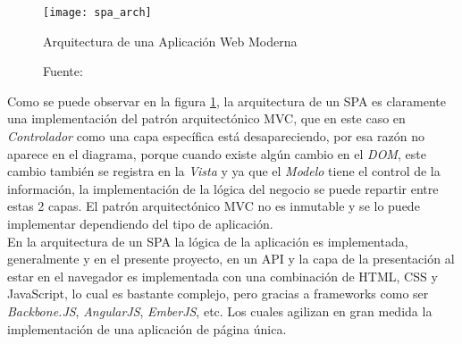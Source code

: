 \begin{figure}[H]
  \begin{center}
    \texttt{[image: spa\_arch]}
    \caption[SPA Architecture ]{Arquitectura de una Aplicación Web Moderna}
    \label{fig:spa_arch}
    \caption*{Fuente: \cite{xp_addison} }
  \end{center}
\end{figure}


Como se puede observar en la figura \ref{fig:spa_arch}, la arquitectura de un SPA es claramente  una implementación del patrón arquitectónico MVC, que en este caso en \emph{Controlador} como una capa específica está desapareciendo, por esa razón no aparece en el diagrama, porque cuando existe algún cambio en el \emph{DOM}, este cambio también se registra en la \emph{Vista} y ya que el \emph{Modelo} tiene el control de la información, la implementación de la lógica del negocio se puede repartir entre estas 2 capas. El patrón arquitectónico MVC no es inmutable y se lo puede implementar dependiendo del tipo de aplicación.\\



En la arquitectura de un SPA la lógica de la aplicación es implementada, generalmente y en el presente proyecto, en un API y la capa de la presentación al estar en el navegador es implementada con una combinación de HTML, CSS y JavaScript, lo cual es bastante complejo, pero gracias a frameworks como ser \emph{Backbone.JS}, \emph{AngularJS}, \emph{EmberJS}, etc. Los cuales agilizan en gran medida la implementación de una aplicación de página única.\\








%
%
%
%
%

